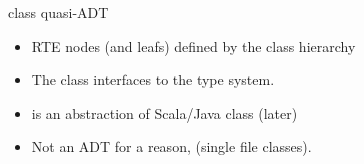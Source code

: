   
  

\begin{frame}{ class quasi-ADT}
  \scalebox{0.9}{}

  \medskip

  \begin{itemize}
  \item RTE nodes (and leafs) defined by the class hierarchy 
  \item The  class interfaces to the type system.
  \item {} is an abstraction of Scala/Java class (later)
  \item Not an ADT for a  reason, (single file   classes).
  \end{itemize}
\end{frame}



